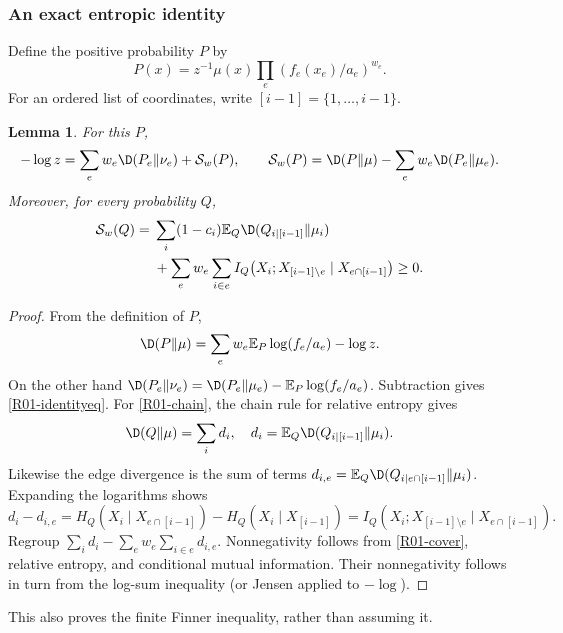 \documentclass[11pt,a4paper]{article}
\newtheorem{lemma}[theorem]{Lemma}
\theoremstyle{definition}\newtheorem{definition}[theorem]{Definition}
\theoremstyle{remark}\newtheorem{remark}[theorem]{Remark}
\newcommand{\E}{\mathbb E}\newcommand{\one}{\mathbf 1}\newcommand{\1}{\mathbf 1}
\numberwithin{equation}{section}
\begin{document}
\subsubsection{An exact entropic identity}
Define the positive probability $P$ by
\[
P(x)=z^{-1}\mu(x)\prod_e(f_e(x_e)/a_e)^{w_e}.
\]
For an ordered list of coordinates, write $[i-1]=\{1,\ldots,i-1\}$.
\begin{lemma}\label{R01-identity}
For this $P$,
\begin{equation}\label{R01-identityeq}
-\log z=\sum_e w_e\D(P_e\Vert\nu_e)+\mathcal S_w(P),
\qquad
\mathcal S_w(P)=\D(P\Vert\mu)-\sum_e w_e\D(P_e\Vert\mu_e).
\end{equation}
Moreover, for every probability $Q$,
\begin{align}\label{R01-chain}
\mathcal S_w(Q)
={}&\sum_i(1-c_i)\E_Q\D(Q_{i\mid[i-1]}\Vert\mu_i)\\
&+\sum_e w_e\sum_{i\in e}
 I_Q\bigl(X_i;X_{[i-1]\setminus e}\mid X_{e\cap[i-1]}\bigr)\geq0.\notag
\end{align}
\end{lemma}
\begin{proof}
From the definition of $P$,
\[
\D(P\Vert\mu)=\sum_e w_e\E_P\log(f_e/a_e)-\log z.
\]
On the other hand $\D(P_e\Vert\nu_e)=\D(P_e\Vert\mu_e)-\E_P\log(f_e/a_e)$. Subtraction gives \eqref{R01-identityeq}.
For \eqref{R01-chain}, the chain rule for relative entropy gives
\[
\D(Q\Vert\mu)=\sum_i d_i,\quad
 d_i=\E_Q\D(Q_{i\mid[i-1]}\Vert\mu_i).
\]
Likewise the edge divergence is the sum of terms $d_{i,e}=\E_Q\D(Q_{i\mid e\cap[i-1]}\Vert\mu_i)$. Expanding the logarithms shows
\[
d_i-d_{i,e}=H_Q(X_i\mid X_{e\cap[i-1]})-H_Q(X_i\mid X_{[i-1]})
=I_Q(X_i;X_{[i-1]\setminus e}\mid X_{e\cap[i-1]}).
\]
Regroup $\sum_i d_i-\sum_e w_e\sum_{i\in e}d_{i,e}$. Nonnegativity follows from \eqref{R01-cover}, relative entropy, and conditional mutual information. Their nonnegativity follows in turn from the log-sum inequality (or Jensen applied to $-\log$).
\end{proof}
This also proves the finite Finner inequality, rather than assuming it.
\end{document}
